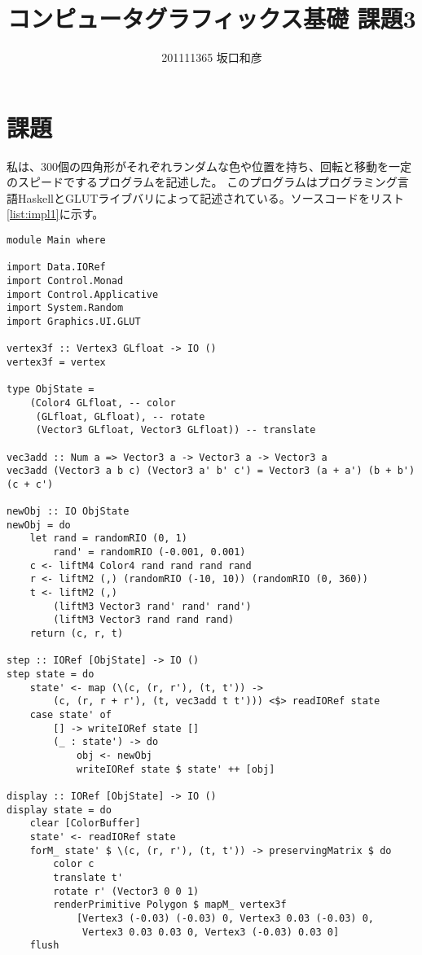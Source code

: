 \documentclass[titlepage]{jsarticle}
\title{コンピュータグラフィックス基礎 課題3}
\author{201111365 坂口和彦}
\begin{document}
\maketitle

\section{課題}

私は、300個の四角形がそれぞれランダムな色や位置を持ち、回転と移動を一定のスピードでするプログラムを記述した。
このプログラムはプログラミング言語HaskellとGLUTライブバリによって記述されている。ソースコードをリスト\ref{list:impl1}に示す。

\begin{lstlisting}[style=program, label=list:impl1, caption=課題3のソースコード]
module Main where

import Data.IORef
import Control.Monad
import Control.Applicative
import System.Random
import Graphics.UI.GLUT

vertex3f :: Vertex3 GLfloat -> IO ()
vertex3f = vertex

type ObjState = 
    (Color4 GLfloat, -- color
     (GLfloat, GLfloat), -- rotate
     (Vector3 GLfloat, Vector3 GLfloat)) -- translate

vec3add :: Num a => Vector3 a -> Vector3 a -> Vector3 a
vec3add (Vector3 a b c) (Vector3 a' b' c') = Vector3 (a + a') (b + b') (c + c')

newObj :: IO ObjState
newObj = do
    let rand = randomRIO (0, 1)
        rand' = randomRIO (-0.001, 0.001)
    c <- liftM4 Color4 rand rand rand rand
    r <- liftM2 (,) (randomRIO (-10, 10)) (randomRIO (0, 360))
    t <- liftM2 (,)
        (liftM3 Vector3 rand' rand' rand')
        (liftM3 Vector3 rand rand rand)
    return (c, r, t)

step :: IORef [ObjState] -> IO ()
step state = do
    state' <- map (\(c, (r, r'), (t, t')) ->
        (c, (r, r + r'), (t, vec3add t t'))) <$> readIORef state
    case state' of
        [] -> writeIORef state []
        (_ : state') -> do
            obj <- newObj
            writeIORef state $ state' ++ [obj]

display :: IORef [ObjState] -> IO ()
display state = do
    clear [ColorBuffer]
    state' <- readIORef state
    forM_ state' $ \(c, (r, r'), (t, t')) -> preservingMatrix $ do
        color c
        translate t'
        rotate r' (Vector3 0 0 1)
        renderPrimitive Polygon $ mapM_ vertex3f
            [Vertex3 (-0.03) (-0.03) 0, Vertex3 0.03 (-0.03) 0,
             Vertex3 0.03 0.03 0, Vertex3 (-0.03) 0.03 0]
    flush


\end{lstlisting}
\end{document}
